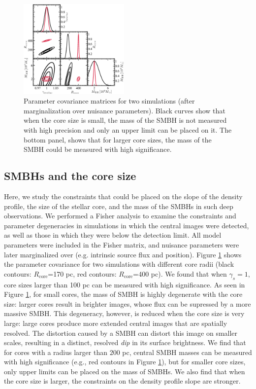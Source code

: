 \documentclass[chicago]{emulateapj}
\begin{document}
\begin{figure}
\begin{center}
\centering
\includegraphics[trim= 2 5 0 0, clip, width=0.48\textwidth]{figures/f_04.eps}
\centering
\end{center}
\caption{ Parameter covariance matrices for two simulations (after marginalization over nuisance parameters). Black curves show that when the core size is small, the mass of the SMBH is not measured with high precision and only an upper limit can be placed on it. The bottom panel, shows that for larger core sizes, the mass of the SMBH could be measured with high significance. 
\label{fig:4}}
\end{figure}



\subsection{SMBHs and the core size}
Here, we study the constraints that could be placed on the slope of the density profile, the size of the stellar core, and the mass of the SMBHs in such deep observations. 
We performed a Fisher analysis to examine the constraints and parameter degeneracies in simulations in which the central images were detected, as well as those in which they were below the detection limit. All model parameters were included in the Fisher matrix, and nuisance parameters were later marginalized over (e.g. intrinsic source flux and position).  
 Figure \ref{fig:4} shows the parameter covariance for two simulations with different core radii (black contours:  $R_{\mathrm{core}}$=170 pc, red contours: $R_{\mathrm{core}}$=400 pc).
We found that when $\gamma_s=1$, core sizes larger than 100 pc can be measured with high significance. As seen in Figure \ref{fig:4}, 
for small cores, the mass of SMBH is highly degenerate with the core size: larger cores result in brighter images, whose flux can be supressed by a more massive SMBH.
This degeneracy,  however,  is reduced when the core size is very large: large cores produce more extended central images that are spatially resolved. The distortion caused by a SMBH can distort this image on smaller scales, resulting in a distinct, resolved \emph{dip} in its surface brightness. 
We find that for cores with a radius larger than $200$ pc, central SMBH masses can be measured with high significance (e.g., red contours in Figure \ref{fig:4}), but for smaller core sizes, only upper limits can be placed on the mass of SMBHs.
We also find that when the core size is larger, the constraints on the density profile slope are stronger.
\end{document}
